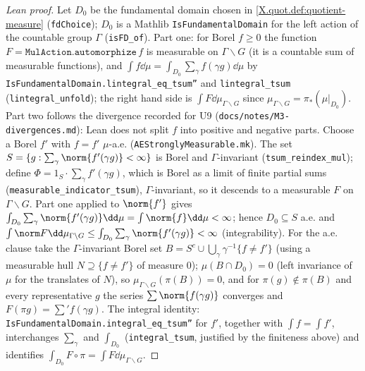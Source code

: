 \begin{proof}[Lean proof]
Let $D_0$ be the fundamental domain chosen in \cref{X.quot.def:quotient-measure} (\texttt{fdChoice}); $D_0$ is a Mathlib \texttt{IsFundamentalDomain} for the left action of the countable group $\Gamma$ (\texttt{isFD\_of}). Part one: for Borel $f\ge0$ the function $F=\texttt{MulAction.automorphize}\,f$ is measurable on $\Gamma\backslash G$ (it is a countable sum of measurable functions), and $\int f\dd\mu=\int_{D_0}\sum_\gamma f(\gamma g)\dd\mu$ by \texttt{IsFundamentalDomain.lintegral\_eq\_tsum''} and \texttt{lintegral\_tsum} (\texttt{lintegral\_unfold}); the right hand side is $\int F\dd\mu_{\Gamma\backslash G}$ since $\mu_{\Gamma\backslash G}=\pi_*(\mu|_{D_0})$. Part two follows the divergence recorded for U9 (\texttt{docs/notes/M3-divergences.md}): Lean does not split $f$ into positive and negative parts. Choose a Borel $f'$ with $f=f'$ $\mu$-a.e. (\texttt{AEStronglyMeasurable.mk}). The set $S=\{g:\sum_\gamma\norm{f'(\gamma g)}<\infty\}$ is Borel and $\Gamma$-invariant (\texttt{tsum\_reindex\_mul}); define $\Phi=1_S\cdot\sum_\gamma f'(\gamma g)$, which is Borel as a limit of finite partial sums (\texttt{measurable\_indicator\_tsum}), $\Gamma$-invariant, so it descends to a measurable $F$ on $\Gamma\backslash G$. Part one applied to $\norm{f'}$ gives $\int_{D_0}\sum_\gamma\norm{f'(\gamma g)}\dd\mu=\int\norm{f}\dd\mu<\infty$; hence $D_0\subseteq S$ a.e. and $\int\norm F\dd\mu_{\Gamma\backslash G}\le\int_{D_0}\sum_\gamma\norm{f'(\gamma g)}<\infty$ (integrability). For the a.e. clause take the $\Gamma$-invariant Borel set $B=S^c\cup\bigcup_\gamma\gamma^{-1}\{f\neq f'\}$ (using a measurable hull $N\supseteq\{f\ne f'\}$ of measure $0$); $\mu(B\cap D_0)=0$ (left invariance of $\mu$ for the translates of $N$), so $\mu_{\Gamma\backslash G}(\pi(B))=0$, and for $\pi(g)\notin\pi(B)$ and every representative $g$ the series $\sum\norm{f(\gamma g)}$ converges and $F(\pi g)=\sum'f(\gamma g)$. The integral identity: \texttt{IsFundamentalDomain.integral\_eq\_tsum''} for $f'$, together with $\int f=\int f'$, interchanges $\sum_\gamma$ and $\int_{D_0}$ (\texttt{integral\_tsum}, justified by the finiteness above) and identifies $\int_{D_0}F\circ\pi=\int F\dd\mu_{\Gamma\backslash G}$.
\end{proof}

